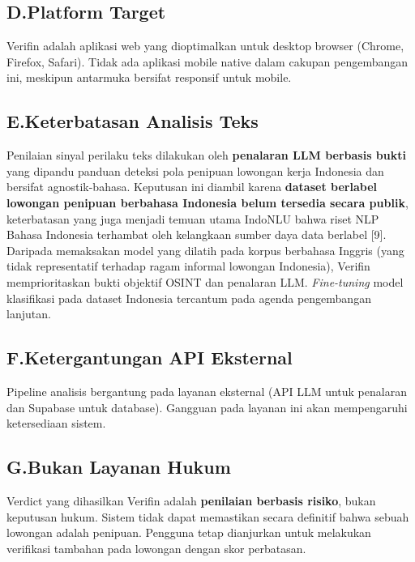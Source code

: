 \documentclass[12pt,a4paper]{article}
\begin{document}
\subsection*{D.\quad Platform Target}
Verifin adalah aplikasi web yang dioptimalkan untuk desktop browser (Chrome, Firefox, Safari).
Tidak ada aplikasi mobile native dalam cakupan pengembangan ini, meskipun antarmuka bersifat
responsif untuk mobile.

\subsection*{E.\quad Keterbatasan Analisis Teks}
Penilaian sinyal perilaku teks dilakukan oleh \textbf{penalaran LLM berbasis bukti} yang
dipandu panduan deteksi pola penipuan lowongan kerja Indonesia dan bersifat
agnostik-bahasa. Keputusan ini diambil karena \textbf{dataset berlabel lowongan
penipuan berbahasa Indonesia belum tersedia secara publik}, keterbatasan yang juga menjadi
temuan utama IndoNLU bahwa riset NLP Bahasa Indonesia terhambat oleh kelangkaan sumber daya
data berlabel [9]. Daripada memaksakan model yang dilatih pada korpus berbahasa Inggris (yang
tidak representatif terhadap ragam informal lowongan Indonesia), Verifin memprioritaskan bukti
objektif OSINT dan penalaran LLM. \textit{Fine-tuning} model klasifikasi pada dataset Indonesia
tercantum pada agenda pengembangan lanjutan.

\subsection*{F.\quad Ketergantungan API Eksternal}
Pipeline analisis bergantung pada layanan eksternal (API LLM untuk penalaran dan Supabase
untuk database). Gangguan pada layanan ini akan mempengaruhi ketersediaan sistem.

\subsection*{G.\quad Bukan Layanan Hukum}
Verdict yang dihasilkan Verifin adalah \textbf{penilaian berbasis risiko}, bukan keputusan
hukum. Sistem tidak dapat memastikan secara definitif bahwa sebuah lowongan adalah penipuan.
Pengguna tetap dianjurkan untuk melakukan verifikasi tambahan pada lowongan dengan skor
perbatasan.
\end{document}
